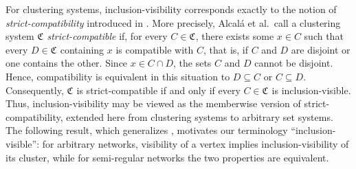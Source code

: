 \documentclass[preprint]{elsarticle}
\newcommand{\CS}[1][]{\ensuremath{\mathfrak{C}_{#1}}}
\begin{document}
For clustering systems, inclusion-visibility corresponds exactly to the notion of
\emph{strict-compatibility} introduced in \cite{ALRR:14}. More precisely, Alcal{\'a} et al.\ call a
clustering system $\CS$ \emph{strict-compatible} if, for every $C\in\CS$, there exists some $x\in C$
such that every $D\in\CS$ containing $x$ is compatible with $C$, that is, if $C$ and $D$ are
disjoint or one contains the other. Since $x\in C\cap D$, the sets $C$ and $D$ cannot be disjoint.
Hence, compatibility is equivalent in this situation to $D\subseteq C$ or $C\subseteq D$.
Consequently, $\CS$ is strict-compatible if and only if every $C\in\CS$ is inclusion-visible. Thus,
inclusion-visibility may be viewed as the memberwise version of strict-compatibility, extended here
from clustering systems to arbitrary set systems. The following result, which generalizes
\cite[Lem.~4.1]{ALRR:14}, motivates our terminology ``inclusion-visible'': for arbitrary networks,
visibility of a vertex implies inclusion-visibility of its cluster, while for semi-regular networks
the two properties are equivalent.
\end{document}
